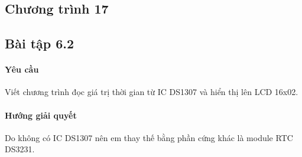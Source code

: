 \subsection*{Chương trình 17}

\subsection{Bài tập 6.2}
\label{Ex:ds3231-1}
\paragraph{Yêu cầu}Viết chương trình đọc giá trị thời gian từ IC DS1307 và hiển thị lên LCD 16x02.
\paragraph{Hướng giải quyết}Do không có IC DS1307 nên em thay thế bằng phần cứng khác là module RTC DS3231.
